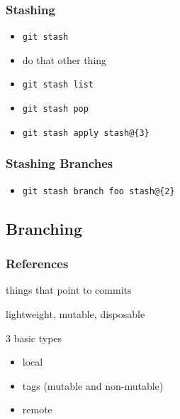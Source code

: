 \documentclass[english]{beamer}
\newcommand{\mysubsection}[2]{%
  \hypertarget{#2}{}%
  \subsection{#1}%
  \label{#2}%
}
\newcommand{\CMD}[1]{%
\texttt{\textcolor{code-blue}{#1}}%
}
\begin{document}
\begin{frame}
\frametitle{Stashing}
\begin{itemize}
        \item \CMD{git stash}
                \vspace{\baselineskip}
        \item do that other thing
                \vspace{\baselineskip}
        \item \CMD{git stash list} \\
        \item \CMD{git stash pop}
        \item \CMD{git stash apply stash@\{3\} }
\end{itemize}
\end{frame}

\begin{frame}
\frametitle{Stashing Branches}
\begin{itemize}
        \item \CMD{git stash branch foo stash@\{2\} }
\end{itemize}
\end{frame}

\mysubsection{Branching}{using:branching}
\begin{frame}
\frametitle{References}
things that point to commits

\vspace{\baselineskip}
lightweight, mutable, disposable

\vspace{\baselineskip}
3 basic types
\begin{itemize}
    \item local \\
    \item tags (mutable and non-mutable) \\
    \item remote
\end{itemize}
\end{frame}
\end{document}
